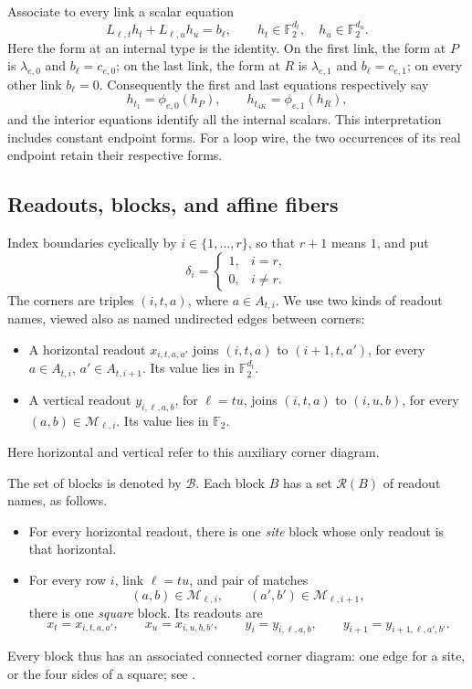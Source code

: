 \documentclass[11pt]{article}
\theoremstyle{definition}
\begin{document}
Associate to every link a scalar equation
\begin{equation}
   L_{\ell,t}h_t+L_{\ell,u}h_u=b_\ell,
   \qquad h_t\in\mathbb F_2^{d_t},\quad h_u\in\mathbb F_2^{d_u}.
   \label{eq:link-equation}
\end{equation}
Here the form at an internal type is the identity. On the first link,
the form at \(P\) is \(\lambda_{e,0}\) and \(b_\ell=c_{e,0}\);
on the last link, the form at \(R\) is \(\lambda_{e,1}\) and
\(b_\ell=c_{e,1}\); on every other link \(b_\ell=0\).
Consequently the first and last equations respectively say
\[
 h_{t_1}=\phi_{e,0}(h_P),
 \qquad
 h_{t_{4K}}=\phi_{e,1}(h_R),
\]
and the interior equations identify all the internal scalars.
This interpretation includes constant endpoint forms. For a loop wire,
the two occurrences of its real endpoint retain their respective forms.

\subsection{Readouts, blocks, and affine fibers}
\label{offset:blocks}

Index boundaries cyclically by \(i\in\{1,\ldots,r\}\), so that \(r+1\)
means \(1\), and put
\[
 \delta_i=
 \begin{cases}
  1,&i=r,\\
  0,&i\ne r.
 \end{cases}
\]
The corners are triples \((i,t,a)\), where \(a\in A_{t,i}\).
We use two kinds of readout names, viewed also as named undirected edges
between corners:
\begin{itemize}
 \item A horizontal readout \(x_{i,t,a,a'}\) joins
 \((i,t,a)\) to \((i+1,t,a')\), for every
 \(a\in A_{t,i}\), \(a'\in A_{t,i+1}\). Its value lies in \(\mathbb F_2^{d_t}\).
 \item A vertical readout \(y_{i,\ell,a,b}\), for \(\ell=tu\), joins
 \((i,t,a)\) to \((i,u,b)\), for every
 \((a,b)\in\mathcal M_{\ell,i}\). Its value lies in \(\mathbb F_2\).
\end{itemize}
Here horizontal and vertical refer to this auxiliary corner diagram.

The set of blocks is denoted by \(\mathcal B\). Each block \(B\) has a set
\(\mathcal R(B)\) of readout names, as follows.
\begin{itemize}
 \item For every horizontal readout, there is one \emph{site} block whose
 only readout is that horizontal.
 \item For every row \(i\), link \(\ell=tu\), and pair of matches
 \[
   (a,b)\in\mathcal M_{\ell,i},\qquad
   (a',b')\in\mathcal M_{\ell,i+1},
 \]
 there is one \emph{square} block. Its readouts are
 \[
  x_t=x_{i,t,a,a'},\qquad x_u=x_{i,u,b,b'},\qquad
  y_i=y_{i,\ell,a,b},\qquad
  y_{i+1}=y_{i+1,\ell,a',b'}.
 \]
\end{itemize}
Every block thus has an associated connected corner diagram: one edge for
a site, or the four sides of a square; see .
\end{document}
